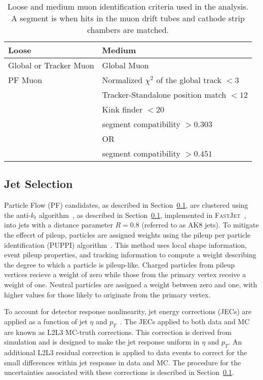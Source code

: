 \begin{table}[htb]
  \begin{center}
    \begin{tabular}{l | l}
    \hline
    \hline
    Loose &  Medium \\
    \hline
    Global or Tracker Muon     & Global Muon  \\
    PF Muon  & Normalized $\chi^{2}$ of the global track $< 3$     \\
      & Tracker-Standalone position match $< 12$  \\
      & Kink finder $< 20$     \\
      & segment compatibility $> 0.303$      \\
      & OR \\
      & segment compatibility $> 0.451$ \\
    \hline
    \hline
    \end{tabular}
   \caption{Loose and medium muon identification criteria used in the analysis. A segment is when hits in the muon drift tubes and cathode strip chambers are matched.\label{tab:muonid}}
  \end{center}
\end{table}

\subsection{Jet Selection}

Particle Flow (PF) candidates, as described in Section~\ref{}, are clustered using the anti-$k_{t}$ algorithm~\cite{antikt}, as described in Section~\ref{}, implemented in \textsc{FastJet}~\cite{FastJet}, into jets with a distance parameter $R=0.8$ (referred to as AK8 jets). To mitigate the effecrt of pileup, particles are assigned weights using the pileup per particle identification (PUPPI) algorithm~\cite{PUPPI}. This method uses local shape information, event pileup properties, and tracking information to compute a weight describing the degree to which a particle is pileup-like. Charged particles from pileup vertices recieve a weight of zero while those from the primary vertex receive a weight of one. Neutral particles are assigned a weight between zero and one, with higher values for those likely to originate from the primary vertex.

To account for detector response nonlinearity, jet energy corrections (JECs) are applied as a function of jet $\eta$ and $p_{T}$~\cite{JEC, JEC2}. The JECs applied to both data and MC are known as L2L3 MC-truth corrections. This correction is derived from simulation and is designed to make the jet response uniform in $\eta$ and $p_{T}$. An additional L2L3 residual correction is applied to data events to correct for the small differences within jet response in data and MC. The procedure for the uncertainties associated with these corrections is described in Section~\ref{}. 

